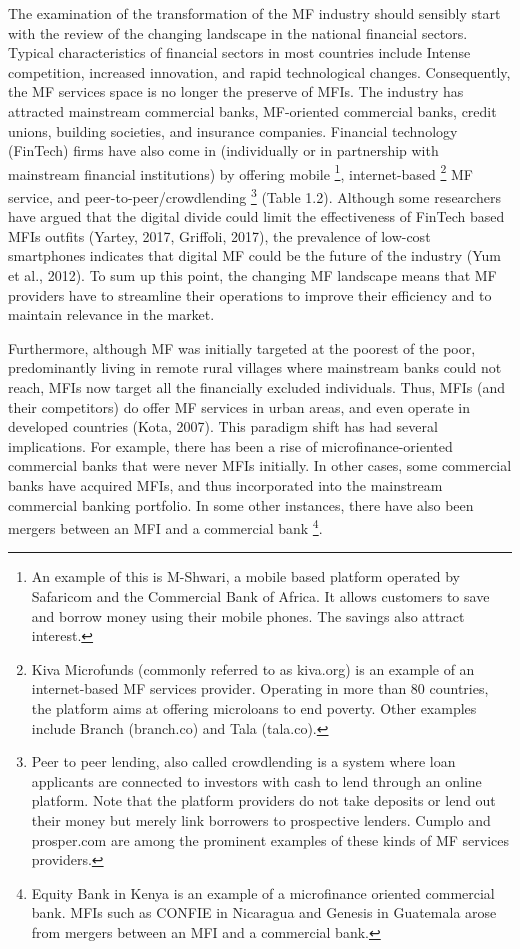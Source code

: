 \documentclass[a4paper, nobind]{templates/ociamthesis}
\begin{document}
The examination of the transformation of the MF industry should sensibly start with the review of the changing landscape in the national financial sectors. Typical characteristics of financial sectors in most countries include Intense competition, increased innovation, and rapid technological changes. Consequently, the MF services space is no longer the preserve of MFIs. The industry has attracted mainstream commercial banks, MF-oriented commercial banks, credit unions, building societies, and insurance companies. Financial technology (FinTech) firms have also come in (individually or in partnership with mainstream financial institutions) by offering mobile \footnote{An example of this is M-Shwari, a mobile based platform operated by Safaricom and the Commercial Bank of Africa. It allows customers to save and borrow money using their mobile phones. The savings also attract interest.}, internet-based \footnote{Kiva Microfunds (commonly referred to as kiva.org) is an example of an internet-based MF services provider. Operating in more than 80 countries, the platform aims at offering microloans to end poverty. Other examples include Branch (branch.co) and Tala (tala.co).} MF service, and peer-to-peer/crowdlending \footnote{Peer to peer lending, also called crowdlending is a system where loan applicants are connected to investors with cash to lend through an online platform. Note that the platform providers do not take deposits or lend out their money but merely link borrowers to prospective lenders. Cumplo and prosper.com are among the prominent examples of these kinds of MF services providers.} (Table 1.2). Although some researchers have argued that the digital divide could limit the effectiveness of FinTech based MFIs outfits (Yartey, 2017, Griffoli, 2017), the prevalence of low-cost smartphones indicates that digital MF could be the future of the industry (Yum et al., 2012). To sum up this point, the changing MF landscape means that MF providers have to streamline their operations to improve their efficiency and to maintain relevance in the market.

Furthermore, although MF was initially targeted at the poorest of the poor, predominantly living in remote rural villages where mainstream banks could not reach, MFIs now target all the financially excluded individuals. Thus, MFIs (and their competitors) do offer MF services in urban areas, and even operate in developed countries (Kota, 2007). This paradigm shift has had several implications. For example, there has been a rise of microfinance-oriented commercial banks that were never MFIs initially. In other cases, some commercial banks have acquired MFIs, and thus incorporated into the mainstream commercial banking portfolio. In some other instances, there have also been mergers between an MFI and a commercial bank \footnote{Equity Bank in Kenya is an example of a microfinance oriented commercial bank. MFIs such as CONFIE in Nicaragua and Genesis in Guatemala arose from mergers between an MFI and a commercial bank.}.
\end{document}
